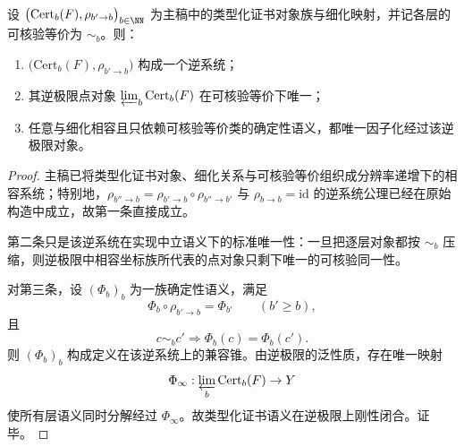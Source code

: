 \begin{proposition}[类型化证书语义的逆极限刚性]\label{prop:conclusion-typed-certificate-inverse-limit-rigidity}
设 \(\bigl(\mathrm{Cert}_b(F),\rho_{b'\to b}\bigr)_{b\in\NN}\) 为主稿中的类型化证书对象族与细化映射，并记各层的可核验等价为 \(\sim_b\)。则：
\begin{enumerate}
  \item \(\bigl(\mathrm{Cert}_b(F),\rho_{b'\to b}\bigr)\) 构成一个逆系统；
  \item 其逆极限点对象 \(\varprojlim_b \mathrm{Cert}_b(F)\) 在可核验等价下唯一；
  \item 任意与细化相容且只依赖可核验等价类的确定性语义，都唯一因子化经过该逆极限对象。
\end{enumerate}
\end{proposition}
\begin{proof}
主稿已将类型化证书对象、细化关系与可核验等价组织成分辨率递增下的相容系统；特别地，\(\rho_{b''\to b}=\rho_{b'\to b}\circ\rho_{b''\to b'}\) 与 \(\rho_{b\to b}=\mathrm{id}\) 的逆系统公理已经在原始构造中成立，故第一条直接成立。

第二条只是该逆系统在实现中立语义下的标准唯一性：一旦把逐层对象都按 \(\sim_b\) 压缩，则逆极限中相容坐标族所代表的点对象只剩下唯一的可核验同一性。

对第三条，设 \((\Phi_b)_b\) 为一族确定性语义，满足
\[
\Phi_b\circ \rho_{b'\to b}=\Phi_{b'}
\qquad (b'\ge b),
\]
且
\[
c\sim_b c'
\Longrightarrow
\Phi_b(c)=\Phi_b(c').
\]
则 \((\Phi_b)_b\) 构成定义在该逆系统上的兼容锥。由逆极限的泛性质，存在唯一映射
\[
\Phi_\infty:\varprojlim_b \mathrm{Cert}_b(F)\to Y
\]
使所有层语义同时分解经过 \(\Phi_\infty\)。故类型化证书语义在逆极限上刚性闭合。证毕。
\end{proof}

